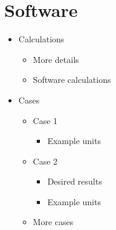 \section{Software}

\begin{itemize}
	\item Calculations
	\begin{itemize}
		\item More details
		\item Software calculations
	\end{itemize}
	\item Cases
	\begin{itemize}
		\item Case 1
		\begin{itemize}
			\item Example units
		\end{itemize}
		\item Case 2
		\begin{itemize}
			\item Desired results
			\item Example units
		\end{itemize}
		\item More cases
	\end{itemize}
\end{itemize}